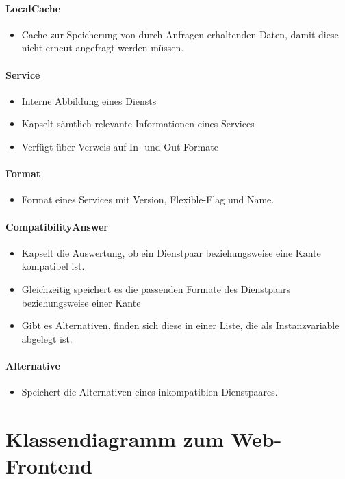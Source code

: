 \paragraph{LocalCache}
\begin{itemize} 
	\item Cache zur Speicherung von durch Anfragen erhaltenden Daten, damit diese nicht erneut angefragt werden müssen. 
\end{itemize}
\paragraph{Service}
\begin{itemize} 
	\item Interne Abbildung eines Diensts
	\item Kapselt sämtlich relevante Informationen eines Services
	\item Verfügt über Verweis auf In- und Out-Formate
\end{itemize}
\paragraph{Format}
\begin{itemize}	
	\item Format eines Services mit Version, Flexible-Flag und Name.
\end{itemize}
\paragraph{CompatibilityAnswer}
\begin{itemize}
	\item Kapselt die Auswertung, ob ein Dienstpaar beziehungsweise eine Kante kompatibel ist. 
	\item Gleichzeitig speichert es die passenden Formate des Dienstpaars beziehungsweise einer Kante
	\item Gibt es Alternativen, finden sich diese in einer Liste, die als Instanzvariable abgelegt ist.
\end{itemize}
\paragraph{Alternative} 
\begin{itemize}
	\item Speichert die Alternativen eines inkompatiblen Dienstpaares.
\end{itemize}

\newpage
\section*{Klassendiagramm zum Web-Frontend}

